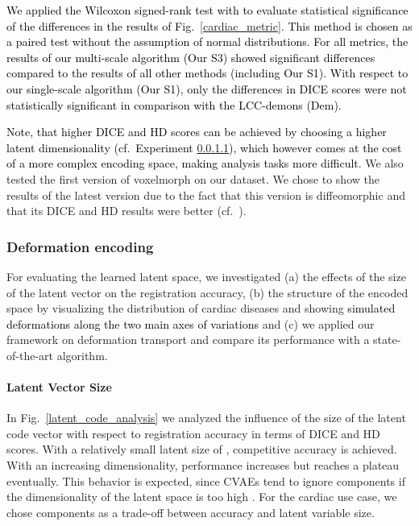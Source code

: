 \documentclass[journal]{IEEEtran}
\newcommand{\update}[1]{\textcolor{black}{#1}}
\begin{document}
\update{We applied the Wilcoxon signed-rank test with  to evaluate statistical significance of the differences in the results of Fig.~\ref{cardiac_metric}. This method is chosen as a paired test without the assumption of normal distributions. For all metrics, the results of our multi-scale algorithm (Our S3) showed significant differences compared to the results of all other methods (including Our S1). With respect to our single-scale algorithm (Our S1), only the differences in DICE scores were not statistically significant in comparison with the LCC-demons (Dem).} 

\update{Note, that higher DICE and HD scores can be achieved by choosing a higher latent dimensionality (cf.\ Experiment \ref{lat_size}), which however comes at the cost of a more complex encoding space, making analysis tasks more difficult.} We also tested the first version of voxelmorph \cite{balakrishnan2018unsupervised} on our dataset. We chose to show the results of the latest version \cite{dalca2018unsupervised} due to the fact that this version is diffeomorphic and that its DICE and HD results were better (cf.\ \cite{krebs2018unsupervised}).

\subsubsection{Deformation encoding}
For evaluating the learned latent space, we investigated (a) the effects of the size of the latent vector on the registration accuracy, (b) the structure of the encoded space by visualizing the distribution of cardiac diseases and showing \update{simulated deformations along the two main axes of variations} and (c) we applied our framework on deformation transport and compare its performance with a state-of-the-art algorithm. 

\paragraph{Latent Vector Size}\label{lat_size} In Fig.~\ref{latent_code_analysis} we analyzed the influence of the size of the latent code vector with respect to registration accuracy in terms of DICE and HD scores. With a relatively small latent size of , competitive accuracy is achieved. With an increasing dimensionality, performance increases but reaches a plateau eventually. This behavior is expected, since CVAEs tend to ignore components if the dimensionality of the latent space is too high \cite{kingma2014semi}. For the cardiac use case, we chose  components as a trade-off between accuracy and latent variable size.
\end{document}
